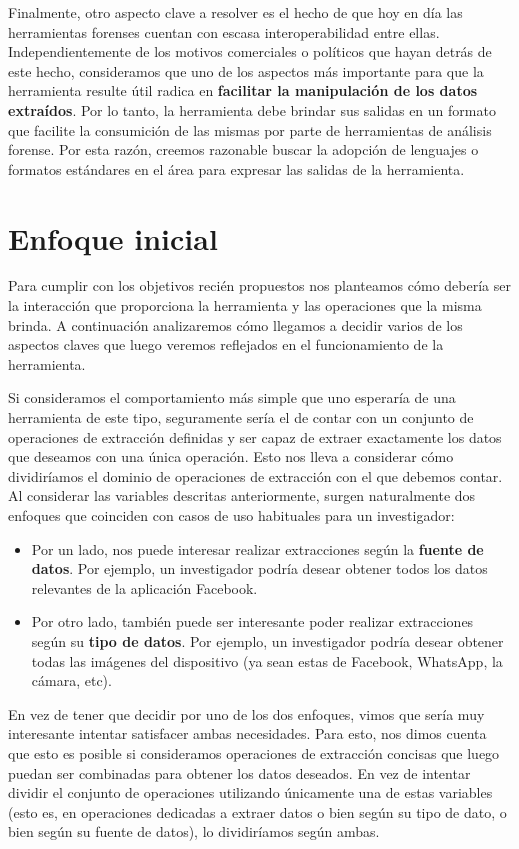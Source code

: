 Finalmente, otro aspecto clave a resolver es el hecho de que hoy en día las herramientas forenses cuentan con escasa interoperabilidad entre ellas. Independientemente de los motivos comerciales o políticos que hayan detrás de este hecho, consideramos que uno de los aspectos más importante para que la herramienta resulte útil radica en \textbf{facilitar la manipulación de los datos extraídos}. Por lo tanto, la herramienta debe brindar sus salidas en un formato que facilite la consumición de las mismas por parte de herramientas de análisis forense. Por esta razón, creemos razonable buscar la adopción de lenguajes o formatos estándares en el área para expresar las salidas de la herramienta.

\section{Enfoque inicial}
Para cumplir con los objetivos recién propuestos nos planteamos cómo debería ser la interacción que proporciona la herramienta y las operaciones que la misma brinda. A continuación analizaremos cómo llegamos a decidir varios de los aspectos claves que luego veremos reflejados en el funcionamiento de la herramienta.

Si consideramos el comportamiento más simple que uno esperaría de una herramienta de este tipo, seguramente sería el de contar con un conjunto de operaciones de extracción definidas y ser capaz de extraer exactamente los datos que deseamos con una única operación. Esto nos lleva a considerar cómo dividiríamos el dominio de operaciones de extracción con el que debemos contar. Al considerar las variables descritas anteriormente, surgen naturalmente dos enfoques que coinciden con casos de uso habituales para un investigador:

\begin{itemize}
\item Por un lado, nos puede interesar realizar extracciones según la \textbf{fuente de datos}. Por ejemplo, un investigador podría desear obtener todos los datos relevantes de la aplicación Facebook.
\item Por otro lado, también puede ser interesante poder realizar extracciones según su \textbf{tipo de datos}. Por ejemplo, un investigador podría desear obtener todas las imágenes del dispositivo (ya sean estas de Facebook, WhatsApp, la cámara, etc).
\end{itemize}

En vez de tener que decidir por uno de los dos enfoques, vimos que sería muy interesante intentar satisfacer ambas necesidades. Para esto, nos dimos cuenta que esto es posible si consideramos operaciones de extracción concisas que luego puedan ser combinadas para obtener los datos deseados. En vez de intentar dividir el conjunto de operaciones utilizando únicamente una de estas variables (esto es, en operaciones dedicadas a extraer datos o bien según su tipo de dato, o bien según su fuente de datos), lo dividiríamos según ambas.

